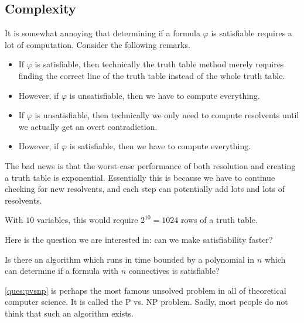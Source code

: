 \documentclass[../notes.tex]{subfiles}
\begin{document}
\subsection{Complexity}
It is somewhat annoying that determining if a formula $\varphi$ is satisfiable requires a lot of computation. Consider the following remarks.
\begin{itemize}
	\item If $\varphi$ is satisfiable, then technically the truth table method merely requires finding the correct line of the truth table instead of the whole truth table.
	\item However, if $\varphi$ is unsatisfiable, then we have to compute everything.
	\item If $\varphi$ is unsatisfiable, then technically we only need to compute resolvents until we actually get an overt contradiction.
	\item However, if $\varphi$ is satisfiable, then we have to compute everything.
\end{itemize}
The bad news is that the worst-case performance of both resolution and creating a truth table is exponential. Essentially this is because we have to continue checking for new resolvents, and each step can potentially add lots and lots of resolvents.
\begin{example}
	With $10$ variables, this would require $2^{10}=1024$ rows of a truth table.
\end{example}
Here is the question we are interested in: can we make satisfiability faster?
\begin{ques} \label{ques:pvsnp}
	Is there an algorithm which runs in time bounded by a polynomial in $n$ which can determine if a formula with $n$ connectives is satisfiable?
\end{ques}
\autoref{ques:pvsnp} is perhaps the most famous unsolved problem in all of theoretical computer science. It is called the {P vs. NP} problem. Sadly, most people do not think that such an algorithm exists.
\end{document}
